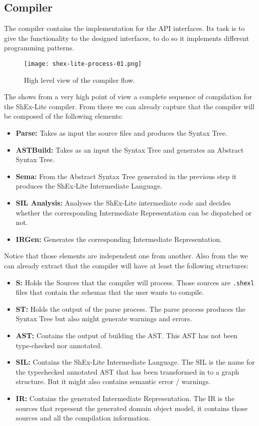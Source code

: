 \subsection{Compiler}
The compiler contains the implementation for the API interfaces. Its task is to give the
functionality to the designed interfaces, to do so it implements different programming
patterns.

\begin{figure}[hb]
    \texttt{[image: shex-lite-process-01.png]}
    \caption[High level view of the compiler flow]{High level view of the compiler flow.}
\end{figure}

The  shows from a very high point of view a complete sequence of compilation
for the ShEx-Lite compiler. From there we can already capture that the compiler will be
composed of the following elements: 

\begin{itemize}
    \item \textbf{Parse:} Takes as input the source files and produces the Syntax Tree. 
    \item \textbf{ASTBuild:} Takes as an input the Syntax Tree and generates an Abstract Syntax Tree.
    \item \textbf{Sema:} From the Abstract Syntax Tree generated in the previous step it produces the ShEx-Lite Intermediate Language.
    \item \textbf{SIL Analysis:} Analyses the ShEx-Lite intermediate code and decides whether the corresponding Intermediate Representation can be dispatched or not.
    \item \textbf{IRGen:} Generates the corresponding Intermediate Representation.
\end{itemize}

Notice that those elements are independent one from another. Also from the 
we can already extract that the compiler will have at least the following structures:

\begin{itemize}
    \item \textbf{S:} Holds the Sources that the compiler will process. Those sources are \texttt{.shexl} files that contain the schemas that the user wants to compile.
    \item \textbf{ST:} Holds the output of the parse process. The parse process produces the Syntax Tree but also might generate warnings and errors. 
    \item \textbf{AST:} Contains the output of building the AST. This AST has not been type-checked nor annotated. 
    \item \textbf{SIL:} Contains the ShEx-Lite Intermediate Language. The SIL is the name for the typechecked annotated AST that has been transformed in to a graph structure. But it might also contains semantic error / warnings. 
    \item \textbf{IR:} Contains the generated Intermediate Representation. The IR is the sources that represent the generated domain object model, it contains those sources and all the compilation information. 
\end{itemize}

